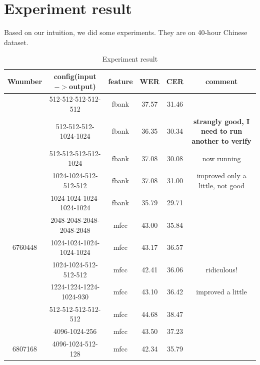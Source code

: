 \documentclass[11pt]{article}
\begin{document}
\section{Experiment result}
Based on our intuition, we did some experiments. They are on 40-hour Chinese dataset.
\begin{table}[htb]
\begin{tabular}{|c|c|c|c|c|c|}
\hline
\hline
Wnumber & config(input$->$output) & feature & WER & CER & comment\\
\hline
& 512-512-512-512-512 & fbank & 37.57 & 31.46 &\\
\hline
& 512-512-512-1024-1024 & fbank & 36.35 & 30.34 & \textbf{strangly good, I need to run another to verify}\\
\hline
& 512-512-512-512-1024 & fbank & 37.08 & 30.08 & now running \\
\hline
& 1024-1024-512-512-512 & fbank & 37.08 & 31.00 & improved only a little, not good\\
\hline
& 1024-1024-1024-1024-1024 & fbank & 35.79 & 29.71 &\\
\hline
\hline
& 2048-2048-2048-2048-2048 & mfcc & 43.00 & 35.84 & \\
\hline
6760448 & 1024-1024-1024-1024-1024 & mfcc & 43.17 & 36.57 & \\
\hline
 & 1024-1024-512-512-512 & mfcc & 42.41 & 36.06 & ridiculous!\\
\hline
& 1224-1224-1224-1024-930 & mfcc & 43.10 & 36.42 & improved a little\\
\hline
& 512-512-512-512-512 & mfcc & 44.68 & 38.47 & \\
\hline
& 4096-1024-256 & mfcc & 43.50 & 37.23 & \\
\hline
6807168 & 4096-1024-512-128 & mfcc & 42.34 & 35.79  \\
\hline
\end{tabular}
\caption{Experiment result}
\end{table}
\end{document}

